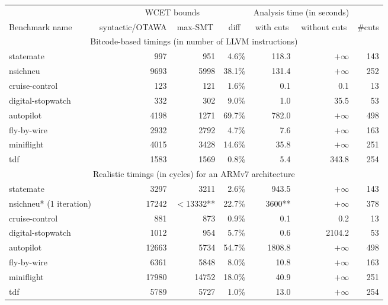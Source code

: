 \documentclass[a4paper,twocolumn,11pt]{article}
\begin{document}
\begin{table*}\small\centering
\begin{tabular}{|l|r|r|r|r|r|r|} \hline
  & \multicolumn{3}{c|}{WCET bounds} & \multicolumn{2}{c|}{Analysis time (in seconds)} & \\
  Benchmark name & \multicolumn{1}{c|}{syntactic/OTAWA} & \multicolumn{1}{c|}{max-SMT}
  & \multicolumn{1}{c|}{diff} & \multicolumn{1}{c|}{with cuts} &
  \multicolumn{1}{c|}{without cuts} & \#cuts \\\hline \hline
  \multicolumn{7}{|c|}{Bitcode-based timings (in number of LLVM instructions)} \\ \hline
  statemate  	&  997 	& 951 	& 4.6\% 	& 118.3 	&  $+\infty$ &  143  \\ 
nsichneu  	&  9693 	& 5998 	& 38.1\% 	& 131.4 	&  $+\infty$ 	&  252  \\ 
cruise-control 	&  123 	& 121 	& 1.6\% 	& 0.1 	&  0.1	&  13  \\ 
digital-stopwatch  	&  332 	& 302 	& 9.0\% 	& 1.0 	&  35.5	&  53  \\ 
autopilot 	&  4198 	& 1271	& 69.7\% 	& 782.0 	&  $+\infty$	&  498  \\ 
fly-by-wire  	&  2932 	& 2792 	& 4.7\% 	& 7.6 	&  $+\infty$	&  163  \\ 
miniflight  	&  4015 	& 3428 	& 14.6\% 	& 35.8 	&  $+\infty$	&  251  \\ 
tdf  	&  1583 	& 1569 	& 0.8\% 	& 5.4 	&  343.8	&  254  \\ 
   \hline
  \multicolumn{7}{|c|}{Realistic timings (in cycles) for an ARMv7 architecture} \\ \hline
  statemate  	&  3297 	& 3211 	& 2.6\% 	& 943.5 	&  $+\infty$ 	&  143  \\ 
nsichneu* (1 iteration)  	&   17242	& $<$13332** & 22.7\% 	& 3600** 	&  $+\infty$	& 378   \\ 
cruise-control 	&  881 	& 873	& 0.9\% 	& 0.1 	&  0.2	&  13  \\ 
digital-stopwatch  	&  1012 	& 954 	& 5.7\% 	& 0.6 	&  2104.2	&  53  \\ 
autopilot  	&  12663 	& 5734	& 54.7\% 	& 1808.8 	&  $+\infty$	&  498  \\ 
fly-by-wire  	&  6361 	& 5848 	& 8.0\% 	& 10.8 	&  $+\infty$	&  163  \\ 
miniflight   	&  17980 	& 14752 	& 18.0\% 	& 40.9 	&  $+\infty$	&  251  \\ 
tdf  	&  5789 	& 5727 	& 1.0\% 	& 13.0 	&  $+\infty$	&  254  \\ 
   \hline

\end{tabular}
\end{table*}
\end{document}
